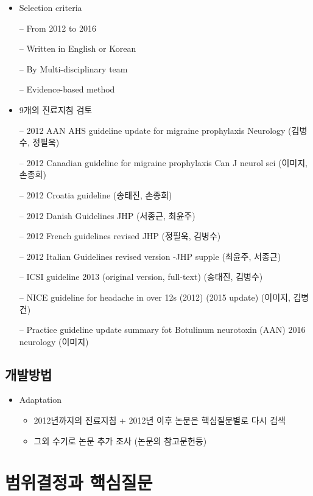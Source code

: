 \documentclass[]{book}
\begin{document}
\begin{itemize}
\item
  Selection criteria

  -- From 2012 to 2016

  -- Written in English or Korean

  -- By Multi-disciplinary team

  -- Evidence-based method
\item
  9개의 진료지침 검토

  -- 2012 AAN AHS guideline update for migraine prophylaxis Neurology (김병수, 정필욱)

  -- 2012 Canadian guideline for migraine prophylaxis Can J neurol sci (이미지, 손종희)

  -- 2012 Croatia guideline (송태진, 손종희)

  -- 2012 Danish Guidelines JHP (서종근, 최윤주)

  -- 2012 French guidelines revised JHP (정필욱, 김병수)

  -- 2012 Italian Guidelines revised version -JHP supple (최윤주, 서종근)

  -- ICSI guideline 2013 (original version, full-text) (송태진, 김병수)

  -- NICE guideline for headache in over 12s (2012) (2015 update) (이미지, 김병건)

  -- Practice guideline update summary fot Botulinum neurotoxin (AAN) 2016 neurology (이미지)
\end{itemize}

\hypertarget{section-18}{%
\section{개발방법}\label{section-18}}

\begin{itemize}
\item
  Adaptation

  \begin{itemize}
  \item
    2012년까지의 진료지침 + 2012년 이후 논문은 핵심질문별로 다시 검색
  \item
    그외 수기로 논문 추가 조사 (논문의 참고문헌등)
  \end{itemize}
\end{itemize}

\hypertarget{section-19}{%
\chapter{범위결정과 핵심질문}\label{section-19}}
\end{document}

